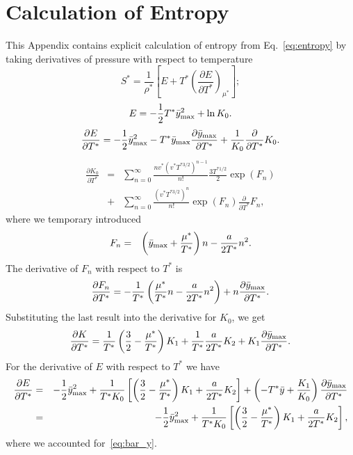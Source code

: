 \documentclass[12pt]{article}
\numberwithin{equation}{section}
\begin{document}
	\section{\label{sec:app:entropy} Calculation of Entropy}
	This Appendix contains explicit calculation of entropy from Eq.~\eqref{eq:entropy} by taking derivatives of pressure with respect to temperature
	\begin{equation}
		S^{*} = \frac{1}{\rho^*} \left[E + T^* \left(\frac{\partial E}{\partial T^*}\right)_{\mu^*}\right];
	\end{equation}
	\begin{equation}
		E = -\frac{1}{2}T^* \bar{y}_{\rm max}^2 + \ln K_0.
	\end{equation}
	\begin{equation}
		\frac{\partial E}{\partial T^*} = -\frac{1}{2}\bar{y}_{\rm max}^2 - T^* \bar{y}_{\rm max} \frac{\partial \bar{y}_{\rm max}}{\partial T^*} + \frac{1}{K_0}\frac{\partial}{\partial T^*} K_0.
	\end{equation}
	\begin{eqnarray}
		\frac{\partial K_0}{\partial T^*} & = & \sum_{n=0}^{\infty} \frac{n v^*(v^* T^{*3/2})^{n-1}}{n!} \frac{3T^{*1/2}}{2}\exp(F_n) 
		\nonumber\\
		& + & \sum_{n=0}^{\infty} \frac{(v^* T^{*3/2})^n}{n!} \exp(F_n) \frac{\partial}{\partial T^*} F_n,
	\end{eqnarray}
	where we temporary introduced
	\begin{eqnarray*}
		F_n & = & \left(\bar{y}_{\rm max} + \frac{\mu^*}{T^*} \right)n -\frac{a}{2T^*}n^2.
	\end{eqnarray*}
	The derivative of $F_n$ with respect to $T^*$ is
	\begin{equation}
		\frac{\partial F_n}{\partial T^*} = -\frac{1}{T^*} \left(\frac{\mu^*}{T^*}n - \frac{a}{2T^*}n^2\right) + n \frac{\partial \bar{y}_{\rm max}}{\partial T^*}.
	\end{equation}
	Substituting the last result into the derivative for $K_0$, we get
	\begin{equation}
		\frac{\partial K}{\partial T^*} = \frac{1}{T^*} \left(\frac{3}{2} - \frac{\mu^*}{T^*} \right)K_1 + \frac{1}{T^*}\frac{a}{2 T^*} K_2 + K_1 \frac{\partial \bar{y}_{\rm max}}{\partial T^*}.
	\end{equation}
	For the derivative of $E$ with respect to $T^*$ we have
	\begin{eqnarray}
		\frac{\partial E}{\partial T^*} & = & -\frac{1}{2}\bar{y}_{\rm max}^2 + \frac{1}{T^* K_0} \left[\left(\frac{3}{2} - \frac{\mu^*}{T^*} \right)K_1 + \frac{a}{2 T^*} K_2\right] + \left(-T^*\bar{y} + \frac{K_1}{K_0}\right) \frac{\partial \bar{y}_{\rm max}}{\partial T^*}
		\nonumber\\
		& = & -\frac{1}{2}\bar{y}_{\rm max}^2 + \frac{1}{T^* K_0} \left[\left(\frac{3}{2} - \frac{\mu^*}{T^*} \right)K_1 + \frac{a}{2 T^*} K_2\right],
	\end{eqnarray}
	where we accounted for~\eqref{eq:bar_y}.
	
\end{document}
